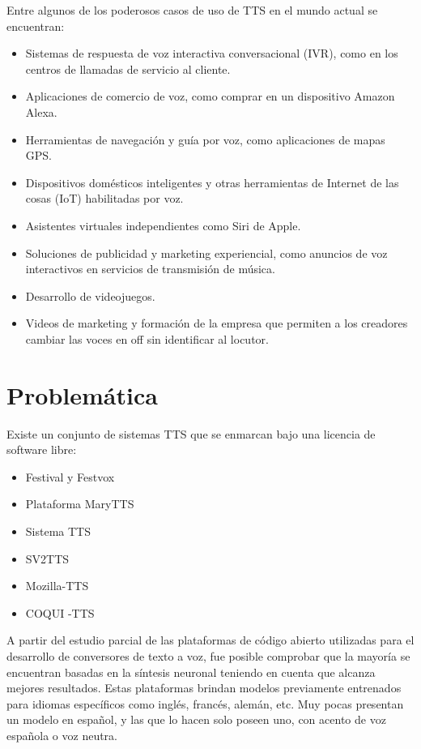 Entre algunos de los poderosos casos de uso de TTS en el mundo actual se encuentran:

\begin{itemize}
	\item Sistemas de respuesta de voz interactiva conversacional (IVR), como en los centros de llamadas de servicio al cliente.
	
	\item Aplicaciones de comercio de voz, como comprar en un dispositivo Amazon Alexa.
	\item Herramientas de navegación y guía por voz, como aplicaciones de mapas GPS.
	\item Dispositivos domésticos inteligentes y otras herramientas de Internet de las cosas (IoT) habilitadas por voz.
	\item Asistentes virtuales independientes como Siri de Apple.
	\item Soluciones de publicidad y marketing experiencial, como anuncios de voz interactivos en servicios de transmisión de música.
	\item Desarrollo de videojuegos.
	\item Videos de marketing y formación de la empresa que permiten a los creadores cambiar las	voces en off sin identificar al locutor.
\end{itemize}

\section*{Problemática}
Existe un conjunto de sistemas TTS que se enmarcan bajo una licencia de software libre:
\begin{itemize}
	\item Festival y Festvox
	\item Plataforma MaryTTS
	\item Sistema TTS
	\item SV2TTS
	\item Mozilla-TTS
	\item COQUI -TTS
\end{itemize}


A partir del estudio parcial de las plataformas de código abierto utilizadas para el desarrollo de conversores de texto a voz, fue posible comprobar que la mayoría se encuentran basadas en la síntesis neuronal teniendo en cuenta que alcanza mejores resultados. Estas plataformas brindan modelos previamente entrenados para idiomas específicos como inglés, francés, alemán, etc. Muy pocas presentan un modelo en español, y las que lo hacen solo poseen uno, con acento de voz española o voz neutra.\\

